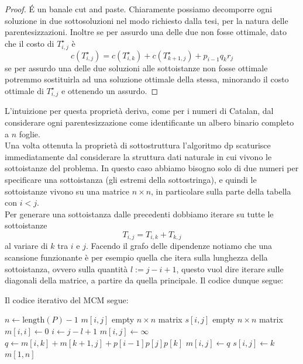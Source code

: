 \documentclass[11pt]{scrartcl}
\begin{document}
	\begin{proof}
		\'E un banale cut and paste. Chiaramente possiamo decomporre ogni soluzione in due sottosoluzioni nel modo richiesto dalla tesi, per la natura delle parentesizzazioni. Inoltre se per assurdo una delle due non fosse ottimale, dato che il costo di $T^\star_{i,j}$ è
		$$c\left(T^\star_{i,j}\right)=c\left(T^\star_{i,k}\right)+c\left(T^\star_{k+1,j}\right)+p_{i-1}q_kr_j$$
		se per assurdo una delle due soluzioni alle sottoistanze non fosse ottimale potremmo sostituirla ad una soluzione ottimale della stessa, minorando il costo ottimale di $T^\star_{i,j}$ e ottenendo un assurdo. 
	\end{proof}
	L'intuizione per questa proprietà deriva, come per i numeri di Catalan, dal considerare ogni parentesizzazione come identificante un albero binario completo a $n$ foglie. \\
	Una volta ottenuta la proprietà di sottostruttura l'algoritmo dp scaturisce immediatamente dal considerare la struttura dati naturale in cui vivono le sottoistanze del problema. In questo caso abbiamo bisogno solo di due numeri per specificare una sottoistanza (gli estremi della sottostringa), e quindi le sottoistanze vivono su una matrice $n\times n$, in particolare sulla parte della tabella con $i<j$. \\
	Per generare una sottoistanza dalle precedenti dobbiamo iterare su tutte le sottoistanze $$T_{i,j}=T_{i,k}+T_{k,j}$$
	al variare di $k$ tra $i$ e $j$. Facendo il grafo delle dipendenze notiamo che una scansione funzionante è per esempio quella che itera sulla lunghezza della sottoistanza, ovvero sulla quantità $l:=j-i+1$, questo vuol dire iterare sulle diagonali della matrice, a partire da quella principale. Il codice dunque segue:
	\begin{algorithm}
		Il codice iterativo del MCM segue:
		\begin{algorithmic}[1]
				\State $n\gets\text{length}(P)-1$ 
				\State $m[i,j]$ empty $n\times n$ matrix
				\State $s[i,j]$ empty $n\times n$ matrix
				 
					\State $m[i,i]\gets 0$
				\EndFor
				 
						\State $i\gets j-l+1$
						\State $m[i,j]\gets \infty$ 
							\State $q\gets m[i,k]+m[k+1,j]+p[i-1]p[j]p[k]$
								\State $m[i,j]\gets q$ 
								\State $s[i,j]\gets k$
							\EndIf
						\EndFor
					\EndFor
				\EndFor
				\State \Return $m[1,n]$
			\EndFunction
		\end{algorithmic}
	\end{algorithm}
	
\end{document}
